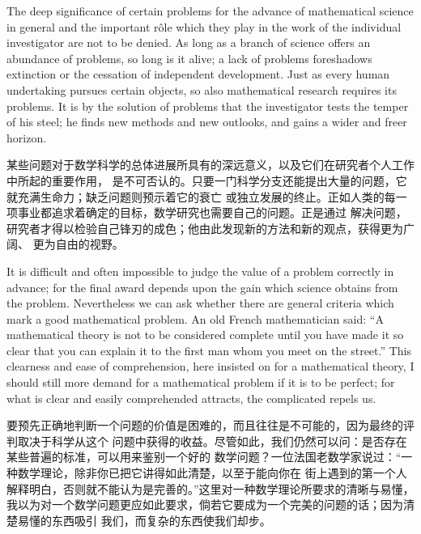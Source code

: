 \documentclass{mojing-translation}
\begin{document}
\begin{pairs}
\begin{original}
The deep significance of certain problems for the advance of mathematical science in general
and the important r\^ole which they play in the work of the individual investigator are not to
be denied. As long as a branch of science offers an abundance of problems, so long is it alive;
a lack of problems foreshadows extinction or the cessation of independent development. Just as
every human undertaking pursues certain objects, so also mathematical research requires its
problems. It is by the solution of problems that the investigator tests the temper of his
steel; he finds new methods and new outlooks, and gains a wider and freer horizon.
\end{original}
\begin{translated}
某些问题对于数学科学的总体进展所具有的深远意义，以及它们在研究者个人工作中所起的重要作用，
是不可否认的。只要一门科学分支还能提出大量的问题，它就充满生命力；缺乏问题则预示着它的衰亡
或独立发展的终止。正如人类的每一项事业都追求着确定的目标，数学研究也需要自己的问题。正是通过
解决问题，研究者才得以检验自己锋刃的成色；他由此发现新的方法和新的观点，获得更为广阔、
更为自由的视野。
\end{translated}

\begin{original}
It is difficult and often impossible to judge the value of a problem correctly in advance; for
the final award depends upon the gain which science obtains from the problem. Nevertheless we
can ask whether there are general criteria which mark a good mathematical problem. An old
French mathematician said: ``A mathematical theory is not to be considered complete until you
have made it so clear that you can explain it to the first man whom you meet on the street.''
This clearness and ease of comprehension, here insisted on for a mathematical theory, I should
still more demand for a mathematical problem if it is to be perfect; for what is clear and
easily comprehended attracts, the complicated repels us.
\end{original}
\begin{translated}
要预先正确地判断一个问题的价值是困难的，而且往往是不可能的，因为最终的评判取决于科学从这个
问题中获得的收益。尽管如此，我们仍然可以问：是否存在某些普遍的标准，可以用来鉴别一个好的
数学问题？一位法国老数学家说过：“一种数学理论，除非你已把它讲得如此清楚，以至于能向你在
街上遇到的第一个人解释明白，否则就不能认为是完善的。”这里对一种数学理论所要求的清晰与易懂，
我以为对一个数学问题更应如此要求，倘若它要成为一个完美的问题的话；因为清楚易懂的东西吸引
我们，而复杂的东西使我们却步。
\end{translated}


\end{pairs}
\end{document}
